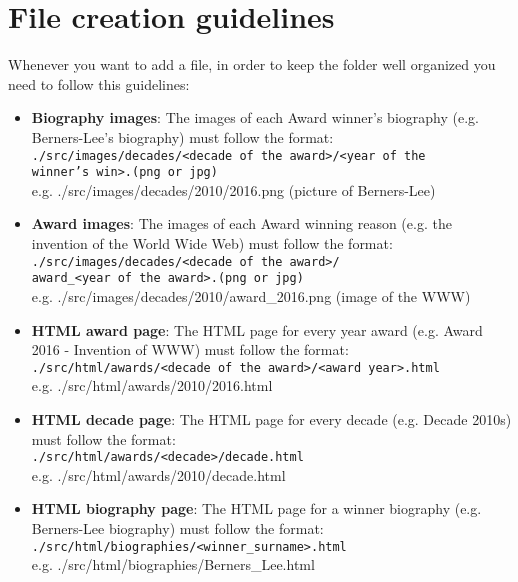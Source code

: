 \documentclass[a4paper,12pt]{article}
\newcommand{\<}{\textless}
\renewcommand{\>}{\textgreater}
\begin{document}
\section{File creation guidelines}
Whenever you want to add a file, in order to keep the folder well organized you need to follow this guidelines:
\begin{itemize}
 \item \textbf{Biography images}: The images of each Award winner's biography (e.g. Berners-Lee's biography) must follow the format:\\ 
 \texttt{./src/images/decades/\<decade of the award\>/\<year of the\\winner's win\>.(png or jpg)}\\[.33em]
 e.g. ./src/images/decades/2010/2016.png (picture of Berners-Lee)
 
 \item \textbf{Award images}: The images of each Award winning reason (e.g. the invention of the World Wide Web) must follow the format:\\
 \texttt{./src/images/decades/\<decade of the award\>/\\award\_\<year of the award\>.(png or jpg)}\\[.33em] 
 e.g. ./src/images/decades/2010/award\_2016.png (image of the WWW)
 
 \item \textbf{HTML award page}: The HTML page for every year award (e.g. Award 2016 - Invention of WWW) must follow the format:\\
 \texttt{./src/html/awards/\<decade of the award\>/<award year>.html}\\[.33em] 
 e.g. ./src/html/awards/2010/2016.html
 
 \newpage
 
 \item \textbf{HTML decade page}: The HTML page for every decade (e.g. Decade 2010s) must follow the format:\\
 \texttt{./src/html/awards/\<decade\>/decade.html}\\[.33em] 
 e.g. ./src/html/awards/2010/decade.html
 
 \item \textbf{HTML biography page}: The HTML page for a winner biography (e.g. Berners-Lee biography) must follow the format:\\
 \texttt{./src/html/biographies/\<winner\_surname\>.html}\\[.33em] 
 e.g. ./src/html/biographies/Berners\_Lee.html 
 
\end{itemize}
\end{document}
